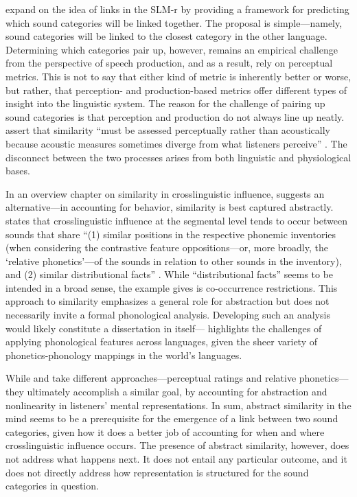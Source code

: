 \citet{flege_2021_slmr} expand on the idea of links in the SLM-r by providing a framework for predicting which sound categories will be linked together. The proposal is simple---namely, sound categories will be linked to the closest category in the other language. Determining which categories pair up, however, remains an empirical challenge from the perspective of speech production, and as a result, \citet{flege_2021_slmr} rely on perceptual metrics. This is not to say that either kind of metric is inherently better or worse, but rather, that perception- and production-based metrics offer different types of insight into the linguistic system. The reason for the challenge of pairing up sound categories is that perception and production do not always line up neatly. \citeauthor{flege_2021_slmr} assert that similarity ``must be assessed perceptually rather than acoustically because acoustic measures sometimes diverge from what listeners perceive'' \citeyearpar[][p. 33]{flege_2021_slmr}. The disconnect between the two processes arises from both linguistic and physiological bases. 

In an overview chapter on similarity in crosslinguistic influence, \citet{chang_2015_similarity} suggests an alternative---in accounting for behavior, similarity is best captured abstractly. \citeauthor{chang_2015_similarity} states that crosslinguistic influence at the segmental level tends to occur between sounds that share ``(1) similar positions in the respective phonemic inventories (when considering the contrastive feature oppositions---or, more broadly, the `relative phonetics'---of the sounds in relation to other sounds in the inventory), and (2) similar distributional facts'' \citeyearpar[][p. 201]{chang_2015_similarity}. While ``distributional facts'' seems to be intended in a broad sense, the example \citeauthor{chang_2015_similarity} gives is co-occurrence restrictions. This approach to similarity emphasizes a general role for abstraction but does not necessarily invite a formal phonological analysis. Developing such an analysis would likely constitute a dissertation in itself---\citet{mielke_2012_similarity} highlights the challenges of applying phonological features across languages, given the sheer variety of phonetics-phonology mappings in the world's languages. 

While \citet{flege_2021_slmr} and \citet{chang_2015_similarity} take different approaches---perceptual ratings and relative phonetics---they ultimately accomplish a similar goal, by accounting for abstraction and nonlinearity in listeners' mental representations. In sum, abstract similarity in the mind seems to be a prerequisite for the emergence of a link between two sound categories, given how it does a better job of accounting for when and where crosslinguistic influence occurs. The presence of abstract similarity, however, does not address what happens next. It does not entail any particular outcome, and it does not directly address how representation is structured for the sound categories in question. 

